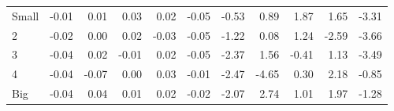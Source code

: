 \begin{table}[!ht]
\begin{tabular}{lrrrrrrrrrr}
    \\
      \cmidrule(r){2-6} \cmidrule(r){7-11}

    Small   & -0.01  & 0.01  & 0.03  & 0.02  & -0.05  & -0.53  & 0.89  & 1.87  & 1.65  & -3.31  \\
         2  & -0.02  & 0.00  & 0.02  & -0.03  & -0.05  & -1.22  & 0.08  & 1.24  & -2.59  & -3.66  \\
         3  & -0.04  & 0.02  & -0.01  & 0.02  & -0.05  & -2.37  & 1.56  & -0.41  & 1.13  & -3.49  \\
         4  & -0.04  & -0.07  & 0.00  & 0.03  & -0.01  & -2.47  & -4.65  & 0.30  & 2.18  & -0.85  \\
    Big     & -0.04  & 0.04  & 0.01  & 0.02  & -0.02  & -2.07  & 2.74  & 1.01  & 1.97  & -1.28  \\

  

  \bottomrule
\end{tabular}
\label{tbl:25_Size_Inv_C1997}
\end{table}